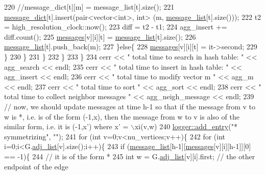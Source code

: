 \begin{DoxyCode}
220             \textcolor{comment}{//message\_dict[t][m] = message\_list[t].size();}
221             \hyperlink{classgraph__message_ab54d89b122c2b1322da0d5db2043fb84}{message\_dict}[t].insert(pair<vector<int>, \textcolor{keywordtype}{int}> (m, 
      \hyperlink{classgraph__message_aa17fdb629b423343edfafa97252763ef}{message\_list}[t].size()));
222             t2 = high\_resolution\_clock::now();
223             diff = t2 - t1;
224             agg\_insert += diff.count();
225             \hyperlink{classgraph__message_aac77e098f0acf9650116a8e51fe3b4b7}{messages}[v][i][t] = \hyperlink{classgraph__message_aa17fdb629b423343edfafa97252763ef}{message\_list}[t].size();
226             \hyperlink{classgraph__message_aa17fdb629b423343edfafa97252763ef}{message\_list}[t].push\_back(m);
227           \}\textcolor{keywordflow}{else}\{
228             \hyperlink{classgraph__message_aac77e098f0acf9650116a8e51fe3b4b7}{messages}[v][i][t] = it->second;
229           \}
230         \}
231       \}
232     \}
233   \}
234   cerr << \textcolor{stringliteral}{" total time to search in hash table: "} << agg\_search << endl;
235   cerr << \textcolor{stringliteral}{" total time to insert in hash table: "} << agg\_insert << endl;
236   cerr << \textcolor{stringliteral}{" total time to modify vector m  "} << agg\_m << endl;
237   cerr << \textcolor{stringliteral}{" total time to sort  "} << agg\_sort << endl;
238   cerr << \textcolor{stringliteral}{" total time to collect neighbor messages "} <<  agg\_neigh\_message << endl;
239   \textcolor{comment}{// now, we should update messages at time h-1 so that if the message from v to w is *, i.e. is of the
       form (-1,x), then the message from w to v is also of the similar form, i.e. it is (-1,x') where x' = \(\backslash\)xi(v,w)}
240   \hyperlink{classlogger_a710163deb17bc81f70d53d285b8ac9ac}{logger::add\_entry}(\textcolor{stringliteral}{"* symmetrizing"}, \textcolor{stringliteral}{""});
241   \textcolor{keywordflow}{for} (\textcolor{keywordtype}{int} v=0;v<nu\_vertices;v++)\{
242     \textcolor{keywordflow}{for} (\textcolor{keywordtype}{int} i=0;i<G.\hyperlink{classmarked__graph_a1a0bf7ca413a278763f7c878b3b6fd6f}{adj\_list}[v].size();i++)\{
243       \textcolor{keywordflow}{if} (\hyperlink{classgraph__message_aa17fdb629b423343edfafa97252763ef}{message\_list}[h-1][\hyperlink{classgraph__message_aac77e098f0acf9650116a8e51fe3b4b7}{messages}[v][i][h-1]][0] == -1)\{
244         \textcolor{comment}{// it is of the form *}
245         \textcolor{keywordtype}{int} w = G.\hyperlink{classmarked__graph_a1a0bf7ca413a278763f7c878b3b6fd6f}{adj\_list}[v][i].first; \textcolor{comment}{// the other endpoint of the edge}

\end{DoxyCode}
